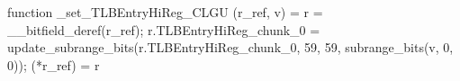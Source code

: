 function _set_TLBEntryHiReg_CLGU (r_ref, v) = {
    r = __bitfield_deref(r_ref);
    r.TLBEntryHiReg_chunk_0 = update_subrange_bits(r.TLBEntryHiReg_chunk_0, 59, 59, subrange_bits(v, 0, 0));
    (*r_ref) = r
}
